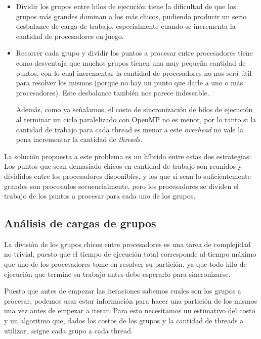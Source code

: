 \begin{itemize}
    \item Dividir los grupos entre hilos de ejecuci\'on tiene la dificultad de que
    los grupos m\'as grandes dominan a los m\'as chicos, pudiendo producir un serio
    desbalance de carga de trabajo, especialmente cuando se incrementa la cantidad de
    procesadores en juego.
    \item Recorrer cada grupo y dividir los puntos a procesar entre procesadores
    tiene como desventaja que muchos grupos tienen una muy peque\~na cantidad de
    puntos, con lo cual incrementar la cantidad de procesadores no nos ser\'a \'util
    para resolver los mismos (porque no hay un punto que darle a uno o m\'as procesadores).
    Este desbalance tambi\'en nos parece indeseable.

    Adem\'as, como ya se\~nalamos, el costo de sincronizaci\'on de hilos de
    ejecuci\'on al terminar un ciclo paralelizado con OpenMP no es menor, por
    lo tanto si la cantidad de trabajo para cada thread es menor a este
    \textit{overhead} no vale la pena incrementar la cantidad de \textit{threads}.
\end{itemize}

La soluci\'on propuesta a este problema es un h\'ibrido entre estas dos
estrategias: Los puntos que sean demasiado chicos en cantidad de trabajo son
reunidos y divididos entre los procesadores disponibles, y los que si sean lo
suficientemente grandes son procesados secuencialmente, pero los procesadores se
dividen el trabajo de los puntos a procesar para cada uno de los grupos.

\subsection{An\'alisis de cargas de grupos}

La divisi\'on de los grupos chicos entre procesadores es una tarea de complejidad
no trivial, puesto que el tiempo de ejecuci\'on total corresponde al tiempo m\'aximo
que uno de los procesadores tome en resolver su partici\'on, ya que todo hilo de
ejecuci\'on que termine su trabajo antes debe esperarlo para sincronizarse.

Puesto que antes de empezar las iteraciones sabemos cuales son los grupos a
procesar, podemos usar estar informaci\'on para hacer una partici\'on de los mismos
una vez antes de empezar a iterar. Para esto necesitamos un estimativo del costo
y un algoritmo que, dados los costos de los grupos y la cantidad de threads a
utilizar, asigne cada grupo a cada thread.

